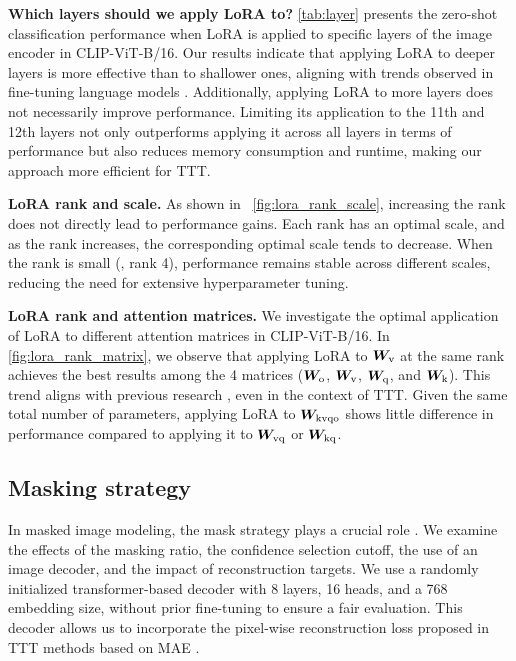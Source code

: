 \noindent\textbf{Which layers should we apply LoRA to?}\hspace{5mm}
\cref{tab:layer} presents the zero-shot classification performance when LoRA is applied to specific layers of the image encoder in CLIP-ViT-B/16.
Our results indicate that applying LoRA to deeper layers is more effective than to shallower ones, aligning with trends observed in fine-tuning language models \citep{zhang2023adalora}.
Additionally, applying LoRA to more layers does not necessarily improve performance.
Limiting its application to the 11th and 12th layers not only outperforms applying it across all layers in terms of performance but also reduces memory consumption and runtime, making our approach more efficient for TTT.
\newline

\noindent\textbf{LoRA rank and scale.}\hspace{5mm}
As shown in ~\cref{fig:lora_rank_scale}, increasing the rank does not directly lead to performance gains.
Each rank has an optimal scale, and as the rank increases, the corresponding optimal scale tends to decrease.
When the rank is small (\eg, rank 4), performance remains stable across different scales, reducing the need for extensive hyperparameter tuning.
\newline

\noindent\textbf{LoRA rank and attention matrices.}\hspace{5mm}
We investigate the optimal application of LoRA to different attention matrices in CLIP-ViT-B/16.
In \cref{fig:lora_rank_matrix}, we observe that applying LoRA to ${\bm{W}}_{\text{v}}$ at the same rank achieves the best results among the 4 matrices (${\bm{W}}_{\text{o}}$, ${\bm{W}}_{\text{v}}$, ${\bm{W}}_{\text{q}}$, and ${\bm{W}}_{\text{k}}$).
This trend aligns with previous research \citep{zhang2023adalora,zanella2024low}, even in the context of TTT.
Given the same total number of parameters, applying LoRA to ${\bm{W}}_{\text{kvqo}}$ shows little difference in performance compared to applying it to ${\bm{W}}_{\text{vq}}$ or ${\bm{W}}_{\text{kq}}$.

\subsection{Masking strategy}
\label{sec:masking}
In masked image modeling, the mask strategy plays a crucial role \citep{hondru2024masked,gao2024mimic}.
We examine the effects of the masking ratio, the confidence selection cutoff, the use of an image decoder, and the impact of reconstruction targets.
We use a randomly initialized transformer-based decoder with 8 layers, 16 heads, and a 768 embedding size, without prior fine-tuning to ensure a fair evaluation.
This decoder allows us to incorporate the pixel-wise reconstruction loss proposed in TTT methods based on MAE \citep{gandelsman2022test, wang2023test}.

